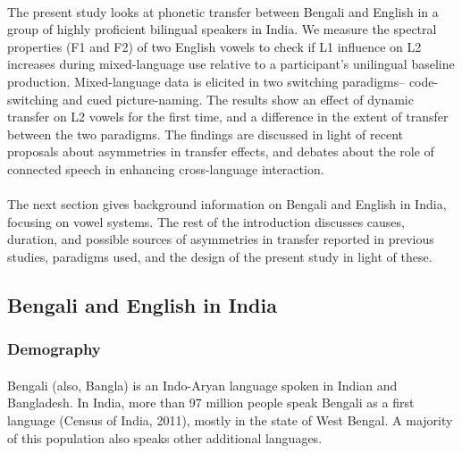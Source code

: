 \documentclass[11pt]{article}
\begin{document}
\paragraph{} The present study looks at phonetic transfer between Bengali and English in a group of highly proficient bilingual speakers in India. We measure the spectral properties (F1 and F2) of two English vowels to check if L1 influence on L2 increases during mixed-language use relative to a participant's unilingual baseline production. Mixed-language data is elicited in two switching paradigms-- code-switching and cued picture-naming. The results show an effect of dynamic transfer on L2 vowels for the first time, and a difference in the extent of transfer between the two paradigms. The findings are discussed in light of recent proposals about asymmetries in transfer effects, and debates about the role of connected speech in enhancing cross-language interaction. 

\paragraph{}The next section gives background information on Bengali and English in India, focusing on vowel systems. The rest of the introduction  discusses causes, duration, and possible sources of asymmetries in transfer reported in previous studies, paradigms used, and the design of the present study in light of these. 

\subsection{Bengali and English in India}

\subsubsection{Demography} 
\paragraph{}Bengali (also, Bangla) is an Indo-Aryan language spoken in Indian and Bangladesh. In India, more than 97 million people speak Bengali as a first language (Census of India, 2011), mostly in the state of West Bengal. A majority of this population also speaks other additional languages.
\end{document}

